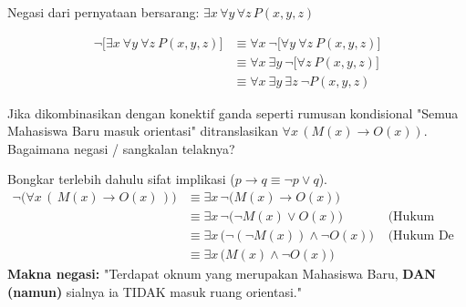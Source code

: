 \begin{contoh}
Negasi dari pernyataan bersarang: $\exists x \, \forall y \, \forall z \, P(x,y,z)$

\begin{align*}
    \neg \Big[ \exists x \ \forall y \ \forall z \ P(x,y,z) \Big] 
    &\equiv \forall x \ \neg \Big[ \forall y \ \forall z \ P(x,y,z) \Big] \\
    &\equiv \forall x \ \exists y \ \neg \Big[ \forall z \ P(x,y,z) \Big] \\
    &\equiv \forall x \ \exists y \ \exists z \ \neg P(x,y,z)
\end{align*}
\end{contoh}

\begin{contoh}
Jika dikombinasikan dengan konektif ganda seperti rumusan kondisional "Semua Mahasiswa Baru masuk orientasi" ditranslasikan $\forall x \, (M(x) \rightarrow O(x))$.
Bagaimana negasi / sangkalan telaknya?

Bongkar terlebih dahulu sifat implikasi ($p \rightarrow q \equiv \neg p \lor q$).
\begin{align*}
    \neg \Big( \forall x \, (\,M(x) \rightarrow O(x)\,) \Big) 
    &\equiv \exists x \, \neg \Big( M(x) \rightarrow O(x) \Big) \\
    &\equiv \exists x \, \neg \Big( \neg M(x) \lor O(x) \Big) & \text{ (Hukum Implikasi)} \\
    &\equiv \exists x \, \Big( \neg(\neg M(x)) \land \neg O(x) \Big) & \text{ (Hukum De Morgan murni)} \\
    &\equiv \exists x \, \Big( M(x) \land \neg O(x) \Big)
\end{align*}
\textbf{Makna negasi:} "Terdapat oknum yang merupakan Mahasiswa Baru, \textbf{DAN (namun)} sialnya ia TIDAK masuk ruang orientasi."
\end{contoh}
